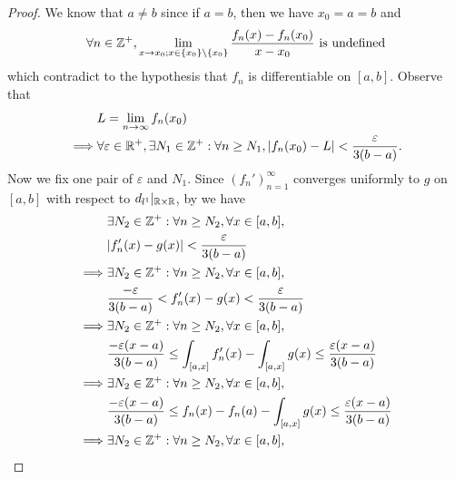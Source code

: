 \begin{proof}
  We know that \(a \neq b\) since if \(a = b\), then we have \(x_0 = a = b\) and
  \[
    \forall n \in \mathbb{Z}^+, \lim_{x \to x_0; x \in \left\lbrace x_0\right\rbrace \setminus \left\lbrace x_0\right\rbrace} \dfrac{f_n(x) - f_n(x_0)}{x - x_0} \text{ is undefined}
  \]
  which contradict to the hypothesis that \(f_n\) is differentiable on \([a, b]\).
  Observe that
  \begin{align*}
             & L = \lim_{n \to \infty} f_n(x_0)                                                                                             \\
    \implies & \forall \varepsilon \in \mathbb{R}^+, \exists N_1 \in \mathbb{Z}^+ : \forall n \geq N_1, \left\lvert f_n(x_0) - L\right\rvert < \dfrac{\varepsilon}{3(b - a)}.
  \end{align*}
  Now we fix one pair of \(\varepsilon\) and \(N_1\).
  Since \((f_n')_{n = 1}^\infty\) converges uniformly to \(g\) on \([a, b]\) with respect to \(d_{l^1}|_{\mathbb{R} \times \mathbb{R}}\), by  we have
  \begin{align*}
             & \exists N_2 \in \Z^+ : \forall n \geq N_2, \forall x \in [a, b],                                                                  \\
             & \abs{f_n'(x) - g(x)} < \dfrac{\varepsilon}{3(b - a)}                                                                              \\
    \implies & \exists N_2 \in \Z^+ : \forall n \geq N_2, \forall x \in [a, b],                                                                  \\
             & \dfrac{-\varepsilon}{3(b - a)} < f_n'(x) - g(x) < \dfrac{\varepsilon}{3(b - a)}                                                   \\
    \implies & \exists N_2 \in \Z^+ : \forall n \geq N_2, \forall x \in [a, b],                                                                  \\
             & \dfrac{-\varepsilon (x - a)}{3(b - a)} \leq \int_{[a, x]} f_n'(x) - \int_{[a, x]} g(x) \leq \dfrac{\varepsilon (x - a)}{3(b - a)} \\
    \implies & \exists N_2 \in \Z^+ : \forall n \geq N_2, \forall x \in [a, b],                                                                  \\
             & \dfrac{-\varepsilon (x - a)}{3(b - a)} \leq f_n(x) - f_n(a) - \int_{[a, x]} g(x) \leq \dfrac{\varepsilon (x - a)}{3(b - a)}       \\
    \implies & \exists N_2 \in \Z^+ : \forall n \geq N_2, \forall x \in [a, b],                                                                  \\

\end{align*}
\end{proof}
